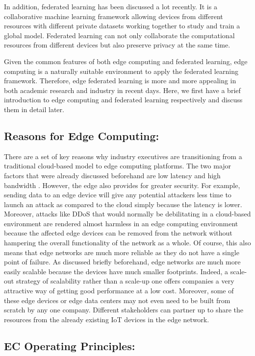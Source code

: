 In addition, federated learning has been discussed a lot recently. It is a collaborative machine learning framework allowing devices from different resources with different private datasets working together to study and train a global model. Federated learning can not only collaborate the computational resources from different devices but also preserve privacy at the same time.


Given the common features of both edge computing and federated learning, edge computing is a naturally suitable environment to apply the federated learning framework. Therefore, edge federated learning is more and more appealing in both academic research and industry in recent days. Here, we first have a brief introduction to edge computing and federated learning respectively and discuss them in detail later. 

\subsection{Reasons for Edge Computing:}

There are a set of key reasons why industry executives are transitioning from 
a traditional cloud-based model to edge computing platforms. The two major factors that were already discussed beforehand are low latency and high bandwidth \cite{satyanarayanan2017emergence}. However, the edge also provides for greater security. For example, sending data to an edge device will give any potential attackers less time to launch an attack as compared to the cloud simply because the latency is lower. Moreover, attacks like DDoS that would normally be debilitating in a cloud-based environment are rendered almost harmless in an edge computing environment because the affected edge devices can be removed from the network without hampering the overall functionality of the network as a whole. Of course, this also means that edge networks are much more reliable as they do not have a single point of failure. As discussed briefly beforehand, edge networks are much more easily scalable because the devices have much smaller footprints. Indeed, a scale-out strategy of scalability rather than a scale-up one offers companies a very attractive way of getting good performance at a low cost. Moreover, some of these edge devices or edge data centers may not even need to be built from scratch by any one company. Different stakeholders can partner up to share the resources from the already existing IoT devices in the edge network.


\subsection{EC Operating Principles:}

